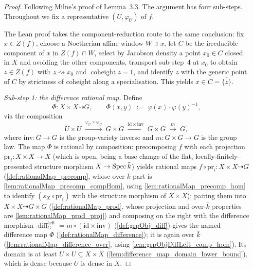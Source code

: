 \begin{proof}\leanok
  Following Milne's proof of Lemma~3.3. The argument has four sub-steps. Throughout we
  fix a representative \((U, \varphi_U)\) of \(f\).

  The Lean proof takes the component-reduction route to the same conclusion: fix
  \(x \in Z(f)\), choose a Noetherian affine window \(W \ni x\), let \(C\) be the
  irreducible component of \(x\) in \(Z(f) \cap W\), select by Jacobson density a point
  \(x_0 \in C\) closed in \(X\) and avoiding the other components, transport
  sub-step~4 at \(x_0\) to obtain \(z \in Z(f)\) with \(z \rightsquigarrow x_0\) and
  \(\operatorname{coheight} z = 1\), and identify \(z\) with the generic point of \(C\)
  by strictness of coheight along a specialisation. This yields
  \(x \in C = \overline{\{z\}}\).

  \emph{Sub-step 1: the difference rational map.} Define
  \[
    \Phi \colon X \times X \dashrightarrow G,
    \qquad
    \Phi(x, y) \;:=\; \varphi(x) \cdot \varphi(y)^{-1},
  \]
  via the composition
  \[
    U \times U
    \;\xrightarrow{\varphi_U \times \varphi_U}\; G \times G
    \;\xrightarrow{\mathrm{id} \times \mathrm{inv}}\; G \times G
    \;\xrightarrow{m}\; G,
  \]
  where \(\mathrm{inv} \colon G \to G\) is the group-variety inverse and
  \(m \colon G \times G \to G\) is the group law. The map \(\Phi\) is rational by
  composition: precomposing \(f\) with each projection
  \(\mathrm{pr}_i \colon X \times X \to X\) (which is open, being a base change of the
  flat, locally-finitely-presented structure morphism \(X \to \operatorname{Spec} \bar k\)) yields
  rational maps \(f \circ \mathrm{pr}_i \colon X \times X \dashrightarrow G\)
  (\cref{def:rationalMap_precomp}, whose over-\(\bar k\) part is
  \cref{lem:rationalMap_precomp_compHom}, using \cref{lem:rationalMap_precomp_hom} to
  identify \((s_X \circ \mathrm{pr}_i)\) with the structure morphism of \(X \times X\));
  pairing them into \(X \times X \dashrightarrow
  G \times G\) (\cref{def:rationalMap_prod}, whose projection and over-\(\bar k\) properties
  are \cref{lem:rationalMap_prod_proj}) and composing on the right with the difference
  morphism \(\operatorname{diff}_G^{\,\mathrm{left}} = m \circ (\mathrm{id} \times \mathrm{inv})\)
  (\cref{def:grpObj_diff}) gives the named difference map \(\Phi\)
  (\cref{def:rationalMap_difference}); it is again over \(\bar k\)
  (\cref{lem:rationalMap_difference_over}, using \cref{lem:grpObjDiffLeft_comp_hom}). Its
  domain is at least \(U \times U \subseteq X \times X\)
  (\cref{lem:difference_map_domain_lower_bound}), which is dense because \(U\) is
  dense in \(X\).


\end{proof}
